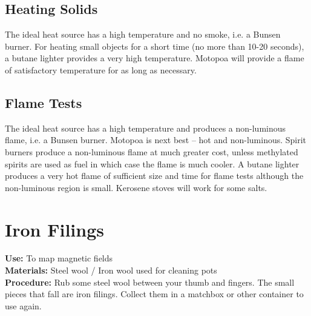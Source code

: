 \begin{multicols}{2}
\subsection{Heating Solids}
The ideal heat source has a high temperature and no smoke, i.e. a Bunsen burner. 
For heating small objects for a short time (no more than 10-20 seconds), 
a butane lighter provides a very high temperature. 
Motopoa will provide a flame of satisfactory temperature 
for as long as necessary.

\columnbreak

\subsection{Flame Tests}
The ideal heat source has a high temperature 
and produces a non-luminous flame, i.e. a Bunsen burner. 
Motopoa is next best – hot and non-luminous. 
Spirit burners produce a non-luminous flame at much greater cost, 
unless methylated spirits are used as fuel 
in which case the flame is much cooler. 
A butane lighter produces a very hot flame of sufficient size 
and time for flame tests although the non-luminous region is small. 
Kerosene stoves will work for some salts.


\section{Iron Filings}
\label{sec:iron-filings}
\vspace{-10pt}
\textbf{Use:} To map magnetic fields\\
\textbf{Materials:} Steel wool / Iron wool used for cleaning pots\\
\textbf{Procedure:} Rub some steel wool between your thumb and fingers.  The small pieces that fall are iron filings.  Collect them in a matchbox or other container to use again.


\end{multicols}
